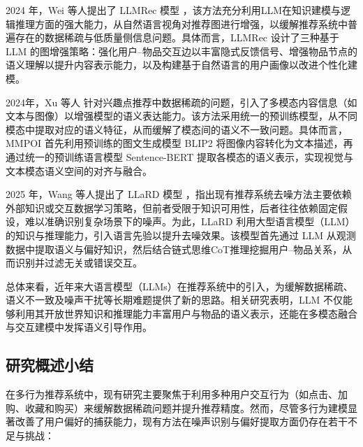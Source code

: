2024 年，Wei 等人提出了 LLMRec 模型 \cite{wei2024llmrec}，该方法充分利用LLM在知识建模与逻辑推理方面的强大能力，从自然语言视角对推荐图进行增强，以缓解推荐系统中普遍存在的数据稀疏与低质量侧信息问题。具体而言，LLMRec 设计了三种基于 LLM 的图增强策略：强化用户–物品交互边以丰富隐式反馈信号、增强物品节点的语义理解以提升内容表示能力，以及构建基于自然语言的用户画像以改进个性化建模。

2024年，Xu 等人 \cite{MMPOI} 针对兴趣点推荐中数据稀疏的问题，引入了多模态内容信息（如文本与图像）以增强模型的语义表达能力。该方法采用统一的预训练模型，从不同模态中提取对应的语义特征，从而缓解了模态间的语义不一致问题。具体而言，MMPOI 首先利用预训练的图文生成模型 BLIP2 \cite{BLIP-2} 将图像内容转化为文本描述，再通过统一的预训练语言模型 Sentence-BERT \cite{Sentence-BERT} 提取各模态的语义表示，实现视觉与文本模态语义空间的对齐与融合。

2025 年，Wang 等人提出了 LLaRD 模型 \cite{wang2025unleashing}，指出现有推荐系统去噪方法主要依赖外部知识或交互数据学习策略，但前者受限于知识可用性，后者往往依赖固定假设，难以准确识别复杂场景下的噪声。为此，LLaRD 利用大型语言模型（LLM）的知识与推理能力，引入语言先验以提升去噪效果。该模型首先通过 LLM 从观测数据中提取语义与偏好知识，然后结合链式思维CoT推理挖掘用户–物品关系，从而识别并过滤无关或错误交互。

总体来看，近年来大语言模型（LLMs）在推荐系统中的引入，为缓解数据稀疏、语义不一致及噪声干扰等长期难题提供了新的思路。相关研究表明，LLM 不仅能够利用其开放世界知识和推理能力丰富用户与物品的语义表示，还能在多模态融合与交互建模中发挥语义引导作用。

\subsection{研究概述小结}
在多行为推荐系统中，现有研究主要聚焦于利用多种用户交互行为（如点击、加购、收藏和购买）来缓解数据稀疏问题并提升推荐精度。然而，尽管多行为建模显著改善了用户偏好的捕获能力，现有方法在噪声识别与偏好提取方面仍存在若干不足与挑战：


